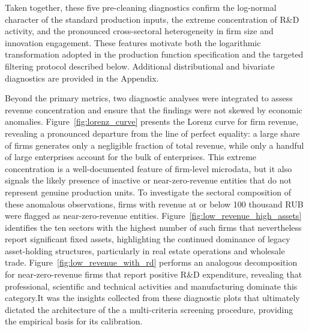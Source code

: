 \documentclass[a4paper, 12pt]{article}
\begin{document}
Taken together, these five pre-cleaning diagnostics confirm the log-normal character of the standard production inputs, the extreme concentration of R\&D activity, and the pronounced cross-sectoral heterogeneity in firm size and innovation engagement. These features motivate both the logarithmic transformation adopted in the production function specification and the targeted filtering protocol described below. Additional distributional and bivariate diagnostics are provided in the Appendix.\hypertarget{target:revenue_dist_sector}{}\hypertarget{target:dist_pl_revenue}{}\hypertarget{target:dist_fixed_assets}{}\hypertarget{target:dist_cost_sales}{}\hypertarget{target:dist_rd_assets}{}\hypertarget{target:dist_labor_costs}{}\hypertarget{target:box_revenue_rd}{}\hypertarget{target:box_assets_rd}{}\hypertarget{target:box_cost_sales_rd}{}\hypertarget{target:box_labor_rd}{}\hypertarget{target:scatter_rev_assets}{}\hypertarget{target:scatter_rev_cost}{}\hypertarget{target:scatter_rev_labor}{}\hypertarget{target:scatter_assets_labor}{}\hypertarget{target:scatter_assets_cost}{}\hypertarget{target:scatter_cost_labor}{}

Beyond the primary metrics, two diagnostic analyses were integrated to assess revenue concentration and ensure that the findings were not skewed by economic anomalies.  Figure~\ref{fig:lorenz_curve} \hypertarget{target:lorenz_curve}{} presents the Lorenz curve for firm revenue, revealing a pronounced departure from the line of perfect equality: a large share of firms generates only a negligible fraction of total revenue, while only a handful of large enterprises account for the bulk of enterprises. This extreme concentration is a well-documented feature of firm-level microdata, but it also signals the likely presence of inactive or near-zero-revenue entities that do not represent genuine production units. To investigate the sectoral composition of these anomalous observations, firms with revenue at or below 100 thousand RUB were flagged as near-zero-revenue entities. Figure~\ref{fig:low_revenue_high_assets} \hypertarget{target:low_revenue_high_assets}{} identifies the ten sectors with the highest number of such firms that nevertheless report significant fixed assets, highlighting the continued dominance of legacy asset-holding structures, particularly in real estate operations and wholesale trade. Figure~\ref{fig:low_revenue_with_rd} \hypertarget{target:low_revenue_with_rd}{} performs an analogous decomposition for near-zero-revenue firms that report positive R\&D expenditure, revealing that professional, scientific and technical activities and manufacturing dominate this category.It was the insights collected from these diagnostic plots that ultimately dictated the architecture of the a multi-criteria screening procedure, providing the empirical basis for its calibration.
\end{document}
